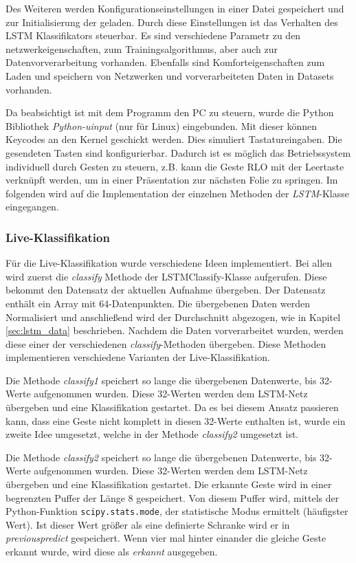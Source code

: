 Des Weiteren werden Konfigurationseinstellungen in einer Datei gespeichert und
zur Initialisierung der geladen. Durch diese Einstellungen ist das Verhalten des
\ac{LSTM} Klassifikators steuerbar. Es sind verschiedene Parametr zu den
netzwerkeigenschaften, zum Trainingsalgorithmus, aber auch zur
Datenvorverarbeitung vorhanden. Ebenfalls sind Komforteigenschaften zum Laden
und speichern von Netzwerken und vorverarbeiteten Daten in Datasets vorhanden.

Da beabsichtigt ist mit dem Programm den PC zu steuern, wurde die Python
Bibliothek \textit{Python-uinput} (nur für Linux) eingebunden. Mit dieser können
Keycodes an den Kernel geschickt werden. Dies simuliert Tastatureingaben. Die
gesendeten Tasten sind konfigurierbar. Dadurch ist es möglich das Betriebssystem
individuell durch Gesten zu steuern, z.B. kann die Geste \ac{RLO} mit der
Leertaste verknüpft werden, um in einer Präsentation zur nächsten Folie zu
springen.
Im folgenden wird auf die Implementation der einzelnen Methoden der
\textit{LSTM}-Klasse eingegangen.

\subsubsection*{Live-Klassifikation} 
Für die Live-Klassifikation wurde verschiedene Ideen implementiert.
Bei allen wird zuerst die \textit{classify} Methode der LSTMClassify-Klasse aufgerufen.
Diese bekommt den Datensatz der aktuellen Aufnahme übergeben.
Der Datensatz enthält ein Array mit 64-Datenpunkten. Die übergebenen Daten
werden Normalisiert und anschließend wird der Durchschnitt abgezogen, wie in
Kapitel \autoref{sec:lstm_data} beschrieben. Nachdem die Daten vorverarbeitet
wurden, werden diese einer der verschiedenen \textit{classify}-Methoden
übergeben. Diese Methoden implementieren verschiedene Varianten der Live-Klassifikation.

Die Methode \textit{classify1} speichert so lange die übergebenen Datenwerte, 
bis 32-Werte aufgenommen wurden. Diese 32-Werten werden dem \ac{LSTM}-Netz 
übergeben und eine Klassifikation gestartet. Da es bei diesem Ansatz passieren kann, 
dass eine Geste nicht komplett in diesen 32-Werte enthalten ist, wurde ein zweite 
Idee umgesetzt, welche in der Methode \textit{classify2} umgesetzt ist.

Die Methode \textit{classify2} speichert so lange die übergebenen Datenwerte,
bis 32-Werte aufgenommen wurden. Diese 32-Werten werden dem \ac{LSTM}-Netz
übergeben und eine Klassifikation gestartet. Die erkannte Geste wird in einer
begrenzten Puffer der Länge 8 gespeichert. Von diesem Puffer wird, mittels der
Python-Funktion \texttt{scipy.stats.mode}, der statistische Modus ermittelt
(häufigster Wert). Ist dieser Wert größer als eine definierte Schranke wird er
in \textit{previouspredict} gespeichert. Wenn vier mal hinter einander die
gleiche Geste erkannt wurde, wird diese als \textit{erkannt} ausgegeben.


